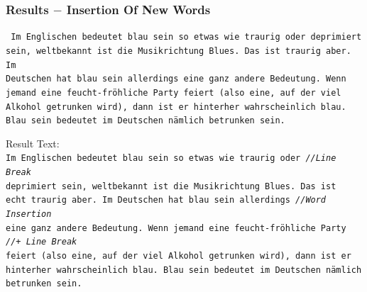 \documentclass{beamer}
\begin{document}
\begin{frame}
\frametitle{Results $-$ Insertion Of New Words}
\texttt{\tiny
Im Englischen bedeutet blau sein so etwas wie traurig oder deprimiert \\
sein, weltbekannt ist die Musikrichtung Blues. Das ist traurig aber. Im \\
Deutschen hat blau sein allerdings eine ganz andere Bedeutung. Wenn \\
jemand eine feucht-fröhliche Party feiert (also eine, auf der viel \\
Alkohol getrunken wird), dann ist er hinterher wahrscheinlich blau. \\
Blau sein bedeutet im Deutschen nämlich betrunken sein. \\
}

Result Text: \\

\texttt{\scriptsize{I}\tiny m Englischen bedeutet blau sein so etwas wie traurig oder \hskip 58pt \emph{//Line Break} \\
\scriptsize{d}\tiny eprimiert sein, weltbekannt ist die Musikrichtung Blues. Das ist \\
\scriptsize{e}\tiny cht traurig aber. Im Deutschen hat blau sein allerdings \hskip 60pt \emph{//Word Insertion}\\
\scriptsize{e}\tiny ine ganz andere Bedeutung. Wenn jemand eine feucht-fröhliche Party \hskip 30pt \emph{//+ Line Break}\\
feiert (also eine, auf der viel Alkohol getrunken wird), dann ist er \\
hinterher wahrscheinlich blau. Blau sein bedeutet im Deutschen nämlich \\
betrunken sein. \\
}
\end{frame}


\end{document}
